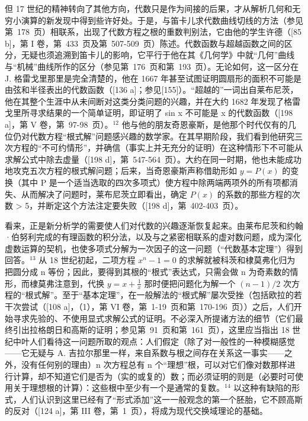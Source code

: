 但 17 世纪的精神转向了其他方向，代数只是作为间接的后果，才从解析几何和无穷小演算的新发现中得到些许好处。于是，与笛卡儿求代数曲线切线的方法（参见第~178~页）相联系，出现了代数方程之根的重数判别法，它由他的学生许德（{[}85 b{]}，第 I 卷，第~433~页及第~507-509~页）陈述。代数函数与超越函数之间的区分，无疑也须追溯到笛卡儿的影响，它平行于他在其《几何学》中就“几何”曲线与“机械”曲线所作的区分（参见第~176~页和第~193~页）。无论如何，这一区分在 J. 格雷戈里那里是完全清楚的，他在 1667 年甚至试图证明圆扇形的面积不可能是由弦和半径表出的代数函数（{[}136 a{]}；参见{[}155{]}）。“超越的”一词出自莱布尼茨，他在其整个生涯中从未间断对这类分类问题的兴趣，并在大约 1682 年发现了格雷戈里所寻求结果的一个简单证明，即证明了 sin x 不可能是 x 的代数函数（{[}198 a{]}，第 V 卷，第~97-98~页）。\(^{12}\) 他与他的朋友奇恩豪斯，是他那个时代仅有的几位仍对代数方程“根式解”问题感兴趣的数学家。在其早期阶段，我们看到他研究三次方程的“不可约情形”，并确信（事实上并无充分的证明）在这种情形下不可能从求解公式中除去虚量（{[}198 d{]}，第~547-564~页）。大约在同一时期，他也未能成功地攻克五次方程的根式解问题；后来，当奇恩豪斯声称借助形如 \(y = P(x)\) 的变换（其中 P 是一个适当选取的四次多项式）使方程中除两端两项外的所有项都消失、从而解决了问题时，莱布尼茨立即看出，确定 \(P(x)\) 的系数的那些方程的次数 \textgreater{} 5，并断定这个方法注定要失败（{[}198 d{]}，第~402-403~页）。

看来，正是新分析学的需要使人们对代数的兴趣逐渐恢复起来。由莱布尼茨和约翰·伯努利完成的有理函数的积分法，以及与之紧密相联系的虚对数问题，成为深化虚数运算的契机，也使多项式分解为一次因子的这一问题（“代数基本定理”）得到回答。\(^{13}\) 从 18 世纪初起，二项方程 \(x^{n}-1=0\) 的求解就被科茨和棣莫弗化归为把圆分成 n 等份；因此，要得到其根的“根式”表达式，只需会做 n 为奇素数的情形，而棣莫弗注意到，代换 \(y = x + \frac{1}{x}\) 那时便把问题化为解一个 \((n - 1)/2\) 次方程的“根式解”。至于“基本定理”，在一般解法的“根式解”屡次受挫（包括欧拉的若干次尝试（{[}108 a{]}，（1），第 VI 卷，第~1-19~页和第~170-196~页））之后，人们开始寻求先验的、不使用显式求解公式的证明。不必深入所提诸方法的细节（它们最终引出拉格朗日和高斯的证明；参见第~91~页和第~161~页），这里应当指出 18 世纪中叶人们看待这一问题所取的观点：人们假定（除了对一般性的一种模糊感觉——它无疑与 A. 吉拉尔那里一样，来自系数与根之间存在关系这一事实——之外，没有任何别的理由）n 次方程总有 n 个“理想”根，可以对它们像对数那样进行计算，却不知道它们是否为（实的或复的）数；而必须证明的则是（必要时可使用关于理想根的计算）：这些根中至少有一个是通常的复数。\(^{14}\) 以这种有缺陷的形式，人们认识到这里已经有了“形式添加”这一一般观念的第一个胚胎，它不顾高斯的反对（{[}124 a{]}，第 III 卷，第~1~页），将成为现代交换域理论的基础。

